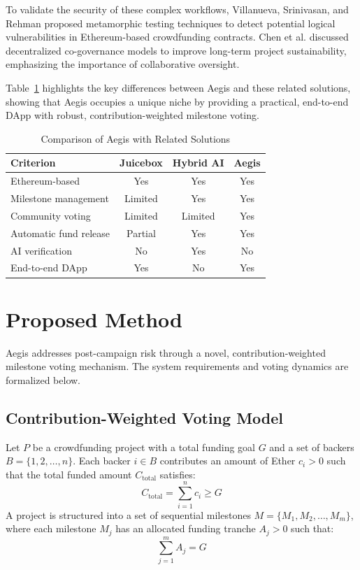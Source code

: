 \documentclass[conference]{IEEEtran}
\begin{document}
To validate the security of these complex workflows, Villanueva, Srinivasan, and Rehman \cite{villanueva2025metamorphic} proposed metamorphic testing techniques to detect potential logical vulnerabilities in Ethereum-based crowdfunding contracts. Chen et al. \cite{chen2023dcc} discussed decentralized co-governance models to improve long-term project sustainability, emphasizing the importance of collaborative oversight.

Table~\ref{tab:comparison} highlights the key differences between Aegis and these related solutions, showing that Aegis occupies a unique niche by providing a practical, end-to-end DApp with robust, contribution-weighted milestone voting.

\begin{table}[t]
\centering
\caption{Comparison of Aegis with Related Solutions}
\label{tab:comparison}
\begin{tabular}{lccc}
\toprule
\textbf{Criterion} & \textbf{Juicebox \cite{juicebox}} & \textbf{Hybrid AI \cite{hybridai}} & \textbf{Aegis} \\
\midrule
Ethereum-based & Yes & Yes & Yes \\
Milestone management & Limited & Yes & Yes \\
Community voting & Limited & Limited & Yes \\
Automatic fund release & Partial & Yes & Yes \\
AI verification & No & Yes & No \\
End-to-end DApp & Yes & No & Yes \\
\bottomrule
\end{tabular}
\end{table}

\section{Proposed Method}
Aegis addresses post-campaign risk through a novel, contribution-weighted milestone voting mechanism. The system requirements and voting dynamics are formalized below.

\subsection{Contribution-Weighted Voting Model}
Let $P$ be a crowdfunding project with a total funding goal $G$ and a set of backers $B = \{1, 2, \dots, n\}$. Each backer $i \in B$ contributes an amount of Ether $c_i > 0$ such that the total funded amount $C_{\text{total}}$ satisfies:
\begin{equation}
C_{\text{total}} = \sum_{i=1}^{n} c_i \ge G
\end{equation}
A project is structured into a set of sequential milestones $M = \{M_1, M_2, \dots, M_m\}$, where each milestone $M_j$ has an allocated funding tranche $A_j > 0$ such that:
\begin{equation}
\sum_{j=1}^{m} A_j = G
\end{equation}
\end{document}

